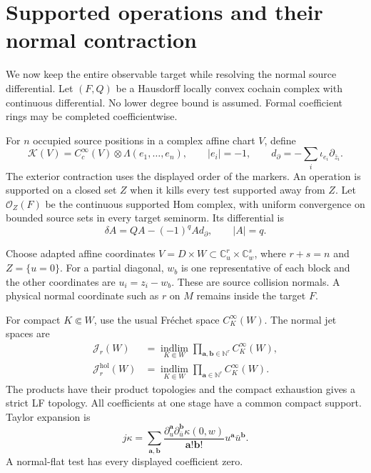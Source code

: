\section{Supported operations and their normal contraction}

We now keep the entire observable target while resolving
the normal source differential. Let $(F,Q)$ be a Hausdorff
locally convex cochain complex with continuous differential.
No lower degree bound is assumed. Formal coefficient rings
may be completed coefficientwise.

For $n$ occupied source positions in a complex affine chart
$V$, define
\[
 \mathcal K(V)=C_c^\infty(V)\otimes\Lambda(e_1,\ldots,e_n),
 \qquad |e_i|=-1,\qquad
 d_\partial=-\sum_i\iota_{e_i}\partial_{\bar z_i}.
\]
The exterior contraction uses the displayed order of the
markers. An operation is supported on a closed set $Z$
when it kills every test supported away from $Z$.
Let $\mathcal O_Z(F)$ be the continuous supported Hom
complex, with uniform convergence on bounded source sets
in every target seminorm. Its differential is
\begin{equation}\label{mht:eq:supported-Hom-differential}
 \delta A=QA-(-1)^q A d_\partial,
 \qquad |A|=q.
\end{equation}

Choose adapted affine coordinates
$V=D\times W\subset\mathbb C^r_u\times\mathbb C^s_w$,
where $r+s=n$ and $Z=\{u=0\}$.
For a partial diagonal, $w_b$ is one representative of
each block and the other coordinates are $u_i=z_i-w_b$.
These are source collision normals. A physical normal
coordinate such as $r$ on $M$ remains inside the target $F$.

For compact $K\Subset W$, use the usual Fr\'echet space
$C_K^\infty(W)$. The normal jet spaces are
\begin{align*}
 \mathcal J_r(W)
   &=\underset{K\Subset W}{\operatorname{indlim}}
         \prod_{\mathbf a,\mathbf b\in\mathbb N^r}C_K^\infty(W),\\
 \mathcal J_r^{\mathrm{hol}}(W)
   &=\underset{K\Subset W}{\operatorname{indlim}}
         \prod_{\mathbf a\in\mathbb N^r}C_K^\infty(W).
\end{align*}
The products have their product topologies and the compact
exhaustion gives a strict LF topology. All coefficients
at one stage have a common compact support. Taylor expansion is
\[
 j\kappa=\sum_{\mathbf a,\mathbf b}
 \frac{\partial_u^{\mathbf a}\partial_{\bar u}^{\mathbf b}
                    \kappa(0,w)}{\mathbf a!\mathbf b!}
                     u^{\mathbf a}\bar u^{\mathbf b}.
\]
A normal-flat test has every displayed coefficient zero.

